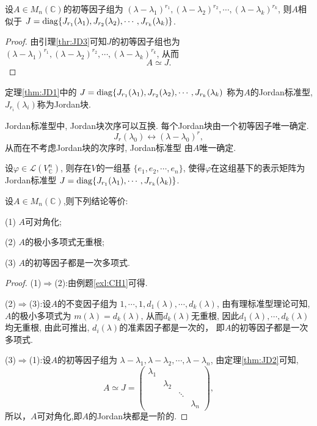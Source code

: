  \begin{theorem}\label{thm:JD1}
   设$A\in M_n(\mathbb{C})$的初等因子组为
   $(\lambda-\lambda_1)^{r_1},(\lambda-\lambda_2)^{r_2},\cdots,(\lambda-\lambda_k)^{r_k}$,
   则$A$相似于
   $J=\operatorname{diag}\{J_{r_1}(\lambda_1),J_{r_2}(\lambda_2),\cdots,J_{r_k}(\lambda_k)\}$.
 \end{theorem}
 \begin{proof}
   由引理\ref{thr:JD3}可知$J$的初等因子组也为
   $(\lambda-\lambda_1)^{r_1},(\lambda-\lambda_2)^{r_2},\cdots,(\lambda-\lambda_k)^{r_k}$,
   从而
   \[A \simeq J.\]
 \end{proof}
 \begin{definition}
   定理\ref{thm:JD1}中的
   $J=\operatorname{diag}\{J_{r_1}(\lambda_1),J_{r_2}(\lambda_2),\cdots,J_{r_k}(\lambda_k)$
   称为$A$的Jordan标准型, $J_{r_i}(\lambda_i)$称为Jordan块.
 \end{definition}
 \begin{notice}
   Jordan标准型中, Jordan块次序可以互换.
   每个Jordan块由一个初等因子唯一确定.
   \[J_{r}(\lambda_0)\longleftrightarrow (\lambda-\lambda_0)^r,\]
   从而在不考虑Jordan块的次序时, Jordan标准型
   由$A$唯一确定.
 \end{notice}
 \begin{theorem}\label{thm:JD2}
   设$\varphi\in \mathcal{L}(V^n_{\mathbb{C}})$,
   则存在$V$的一组基
   $\{e_1,e_2,\cdots,e_n\}$,
   使得$\varphi$在这组基下的表示矩阵为Jordan标准型
   $J=\operatorname{diag}\{J_{r_1}(\lambda_1),\cdots,J_{r_k}(\lambda_k)\}$.
 \end{theorem}
 \begin{deduction}
   设$A\in M_n(\mathbb{C})$,则下列结论等价:

   (1) $A$可对角化;

   (2) $A$的极小多项式无重根;

   (3) $A$的初等因子都是一次多项式.
 \end{deduction}\label{dd:JD1}
 \begin{proof}
   (1)$\Longrightarrow$(2):由例题\ref{exl:CH1}可得.

   (2)$\Longrightarrow$(3):设$A$的不变因子组为
   $1,\cdots,1,d_1(\lambda),\cdots,d_k(\lambda)$,
   由有理标准型理论可知, $A$的极小多项式为
   $m(\lambda)=d_k(\lambda)$,
   从而$d_k(\lambda)$无重根,
   因此$d_1(\lambda),\cdots,d_k(\lambda)$均无重根,
   由此可推出, $d_i(\lambda)$的准素因子都是一次的，
   即$A$的初等因子都是一次多项式.

   (3)$\Longrightarrow$(1):设$A$的初等因子组为
   $\lambda-\lambda_1,\lambda-\lambda_2,\cdots,\lambda-\lambda_n$,
   由定理\ref{thm:JD2}可知,
   \[A \simeq J=
     \begin{pmatrix}
       \lambda_1&&&\\
                &\lambda_2&&\\
                &&\ddots&\\
       &&&\lambda_n
     \end{pmatrix},\]
   所以，$A$可对角化,即$A$的Jordan块都是一阶的.
 \end{proof}
 

